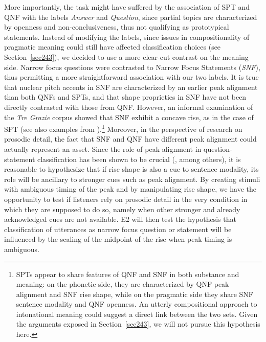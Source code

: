 More importantly, the task might have suffered by the association of SPT and QNF with the labels \textit{Answer} and \textit{Question}, since partial topics are characterized by openness and non-conclusiveness, thus not qualifying as prototypical statements. Instead of modifying the labels, since issues in compositionality of pragmatic meaning could still have affected classification choices (see Section~\ref{sec243}), we decided to use a more clear-cut contrast on the meaning side. Narrow focus questions were contrasted to Narrow Focus Statements (\textit{SNF}), thus permitting a more straightforward association with our two labels. It is true that nuclear pitch accents in SNF are characterized by an earlier peak alignment than both QNFs and SPTs, and that shape proprieties in SNF have not been directly contrasted with those from QNF. However, an informal examination of the \textit{Tre Grazie} corpus showed that SNF exhibit a concave rise, as in the case of SPT (see also examples from \citealt{dimperio2008phonetics}).\footnote{SPTs appear to share features of QNF and SNF in both substance and meaning: on the phonetic side, they are characterized by QNF peak alignment and SNF rise shape, while on the pragmatic side they share SNF sentence modality and QNF openness. An utterly compositional approach to intonational meaning could suggest a direct link between the two sets. Given the arguments exposed in Section~\ref{sec243}, we will not pursue this hypothesis here.} Moreover, in the perspective of research on prosodic detail, the fact that SNF and QNF have different peak alignment could actually represent an asset. Since the role of peak alignment in question-statement classification has been shown to be crucial (\citealt{dimperio2002italian}, among others), it is reasonable to hypothesize that if rise shape is also a cue to sentence modality, its role will be ancillary to stronger cues such as peak alignment. By creating stimuli with ambiguous timing of the peak and by manipulating rise shape, we have the opportunity to test if listeners rely on prosodic detail in the very condition in which they are supposed to do so, namely when other stronger and already acknowledged cues are not available. E2 will then test the hypothesis that classification of utterances as narrow focus question or statement will be influenced by the scaling of the midpoint of the rise when peak timing is ambiguous. 

